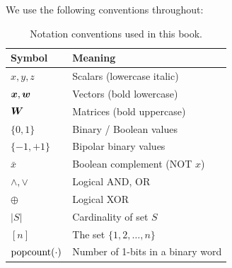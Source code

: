 We use the following conventions throughout:

\begin{table}[htbp]
\centering
\caption{Notation conventions used in this book.}
\label{tab:notation}
\begin{tabular}{@{}ll@{}}
  \toprule
  \textbf{Symbol} & \textbf{Meaning} \\
  \midrule
  $x, y, z$ & Scalars (lowercase italic) \\
  $\bm{x}, \bm{w}$ & Vectors (bold lowercase) \\
  $\bm{W}$ & Matrices (bold uppercase) \\
  $\{0, 1\}$ & Binary / Boolean values \\
  $\{-1, +1\}$ & Bipolar binary values \\
  $\bar{x}$ & Boolean complement (NOT $x$) \\
  $\wedge, \vee$ & Logical AND, OR \\
  $\oplus$ & Logical XOR \\
  $|S|$ & Cardinality of set $S$ \\
  $[n]$ & The set $\{1, 2, \ldots, n\}$ \\
  $\operatorname{popcount}(\cdot)$ & Number of 1-bits in a binary word \\
  \bottomrule
\end{tabular}
\end{table}
